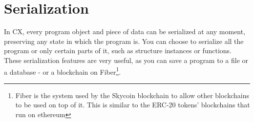 \documentclass[11pt,fleqn,openany]{book} %
\begin{document}



\chapter{Serialization}
\label{chapter:serialization}


In CX, every program object and piece of data can be serialized at any moment, preserving any state in which the program is. You can choose to serialize all the program or only certain parts of it, such as structure instances or functions. These serialization features are very useful, as you can save a program to a file or a database - or a blockchain on Fiber\footnote{Fiber is the system used by the Skycoin blockchain to allow other blockchains to be used on top of it. This is similar to the ERC-20 tokens' blockchains that run on ethereum}.
\end{document}
